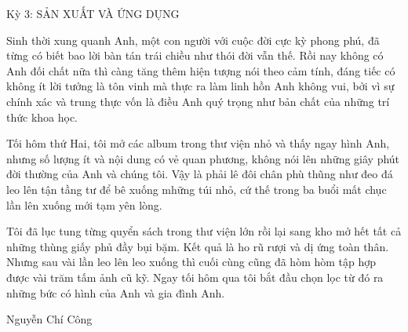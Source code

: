 Kỳ 3: SẢN XUẤT VÀ ỨNG DỤNG

Sinh thời xung quanh Anh, một con người với cuộc đời cực kỳ phong phú, đã từng có biết bao lời bàn tán trái chiều như thói đời vẫn thế. Rồi nay không có Anh đối chất nữa thì càng tăng thêm hiện tượng nói theo cảm tính, đáng tiếc có không ít lời tưởng là tôn vinh mà thực ra làm linh hồn Anh không vui, bởi vì sự chính xác và trung thực vốn là điều Anh quý trọng như bản chất của những trí thức khoa học.

Tối hôm thứ Hai, tôi mở các album trong thư viện nhỏ và thấy ngay hình Anh, nhưng số lượng ít và nội dung có vẻ quan phương, không nói lên những giây phút đời thường của Anh và chúng tôi. Vậy là phải lê đôi chân phù thũng như đeo đá leo lên tận tầng tư để bê xuống mhững túi nhỏ, cứ thế trong ba buổi mất chục lần lên xuống mới tạm yên lòng.

Tôi đã lục tung từng quyển sách trong thư viện lớn rồi lại sang kho mở hết tất cả những thùng giấy phủ đầy bụi bặm. Kết quả là ho rũ rượi và dị ứng toàn thân. Nhưng sau vài lần leo lên leo xuống thì cuối cùng cũng đã hòm hòm tập hợp được vài trăm tấm ảnh cũ kỹ. Ngay tối hôm qua tôi bắt đầu chọn lọc từ đó ra những bức có hình của Anh và gia đình Anh.

Nguyễn Chí Công